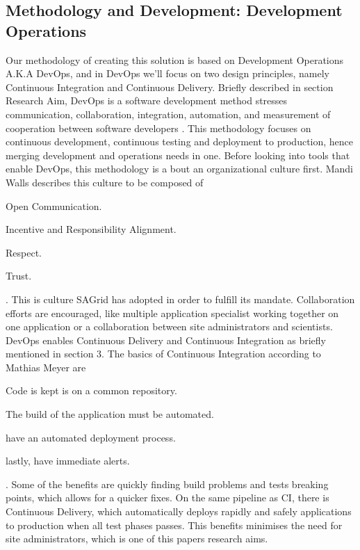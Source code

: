 \documentclass [titlepage,11pt]{article}
\begin{document}
\subsection{Methodology and Development: Development Operations}
Our methodology of creating this solution is based on Development Operations A.K.A DevOps, and in DevOps we'll focus on two design principles, namely Continuous Integration and Continuous Delivery. Briefly described in section Research Aim, DevOps is a software development method  stresses communication, collaboration, integration, automation, and measurement of cooperation between software developers \cite{wikiOps}. This methodology focuses on continuous development, continuous testing and deployment to production, hence merging development and operations needs in one. Before looking into tools that enable DevOps, this methodology is a bout an organizational culture first. Mandi Walls describes this culture to be composed of \begin{enumerate*}[label=\itshape\alph*\upshape)]
\item Open Communication.
\item Incentive and Responsibility Alignment.
\item Respect.
\item Trust. 
\end{enumerate*} \citep{mandi13}. This is culture SAGrid has adopted in order to fulfill its mandate. Collaboration efforts are encouraged, like multiple application specialist working together on one application or a collaboration between site administrators and scientists. \\


DevOps enables Continuous Delivery \cite{delivery15} and Continuous Integration \citep{fowler06} as briefly mentioned in section 3. The basics of Continuous Integration according to Mathias Meyer are  
\begin{enumerate*}[label=\itshape\alph*\upshape)]
\item Code is kept is on a common repository.
\item The build of the application must be automated.
\item have an automated deployment process. 
\item lastly, have immediate alerts.
\end{enumerate*} \citep{meyer14}. Some of the benefits are quickly finding build problems and tests breaking points, which allows for a quicker fixes. On the same pipeline as CI, there is Continuous Delivery, which automatically deploys rapidly and safely applications to production when all test phases passes. This benefits minimises the need for site administrators, which is one of this papers research aims. \\
\end{document}
